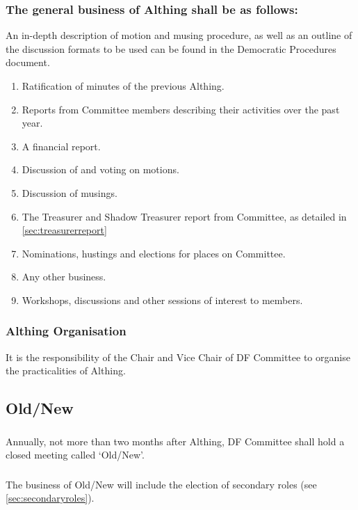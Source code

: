 \documentclass[a4paper, 11pt]{report}
\begin{document}
\subsubsection{The general business of Althing shall be as follows:}
An in-depth description of motion and musing procedure, as well as an outline of the discussion formats to be used can be found in the Democratic Procedures document.

\begin{enumerate}
\item Ratification of minutes of the previous Althing.
\item Reports from Committee members describing their activities over the past year.
\item A financial report.
\item Discussion of and voting on motions.
\item Discussion of musings.
\item The Treasurer and Shadow Treasurer report from Committee, as detailed in \ref{sec:treasurerreport}
\item Nominations, hustings and elections for places on Committee.
\item Any other business.
\item Workshops, discussions and other sessions of interest to members.
\end{enumerate}

\subsubsection{Althing Organisation}
It is the responsibility of the Chair and Vice Chair of DF Committee to organise the practicalities of Althing.


\subsection{Old/New}
\label{sec:oldnew}
\subsubsection{} Annually, not more than two months after Althing, DF Committee shall hold a closed meeting called `Old/New'.

\subsubsection{} The business of Old/New will include the election of secondary roles (see \ref{sec:secondaryroles}).
\end{document}
